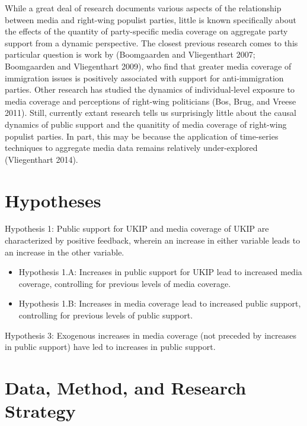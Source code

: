 \documentclass[12pt,article]{article}
\begin{document}
While a great deal of research documents various aspects of the
relationship between media and right-wing populist parties, little is
known specifically about the effects of the quantity of party-specific
media coverage on aggregate party support from a dynamic perspective.
The closest previous research comes to this particular question is work
by (Boomgaarden and Vliegenthart 2007; Boomgaarden and Vliegenthart
2009), who find that greater media coverage of immigration issues is
positively associated with support for anti-immigration parties. Other
research has studied the dynamics of individual-level exposure to media
coverage and perceptions of right-wing politicians (Bos, Brug, and
Vreese 2011). Still, currently extant research tells us surprisingly
little about the causal dynamics of public support and the quanitity of
media coverage of right-wing populist parties. In part, this may be
because the application of time-series techniques to aggregate media
data remains relatively under-explored (Vliegenthart 2014).

\section{Hypotheses}\label{hypotheses}

Hypothesis 1: Public support for UKIP and media coverage of UKIP are
characterized by positive feedback, wherein an increase in either
variable leads to an increase in the other variable.

\begin{itemize}
\item
  Hypothesis 1.A: Increases in public support for UKIP lead to increased
  media coverage, controlling for previous levels of media coverage.
\item
  Hypothesis 1.B: Increases in media coverage lead to increased public
  support, controlling for previous levels of public support.
\end{itemize}

Hypothesis 3: Exogenous increases in media coverage (not preceded by
increases in public support) have led to increases in public support.

\section{Data, Method, and Research
Strategy}\label{data-method-and-research-strategy}
\end{document}
